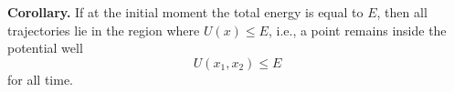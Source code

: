 \textbf{Corollary.} If at the initial moment the total energy is equal to $E$, then all trajectories lie in the region where $U(x) \leq E$, i.e., a point remains inside the potential well
$$U(x_1, x_2) \leq E$$
for all time.
